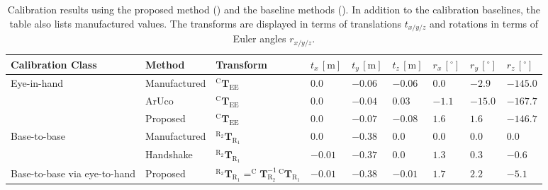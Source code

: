 \begin{landscape}
\begin{table}[]
\caption{Calibration results using the proposed method () and the baseline methods (). In addition to the calibration baselines, the table also lists manufactured values. The transforms are displayed in terms of translations $t_{x/y/z}$ and rotations in terms of Euler angles $r_{x/y/z}$.}
\label{c4:tab:calibration_results}
\centering
\begin{tabular}{|l|l|l|l|l|l|l|l|l|}
\hline
Calibration Class             & Method       & Transform                                                                                                        & $t_x\,[\text{m}]$ & $t_y\,[\text{m}]$ & $t_z\,[\text{m}]$ & $r_x\,[^\circ]$ & $r_y\,[^\circ]$ & $r_z\,[^\circ]$ \\ \hline
\multirow{3}{*}{Eye-in-hand}  & Manufactured & $^\text{C}\mathbf{T}_\text{EE}$                                                                                  & $ 0.0$            & $-0.06$           & $-0.06$           & $ 0.0$          & $-2.9$          & $-145.0$        \\ \cline{2-9} 
                              & ArUco        & $^\text{C}\mathbf{T}_\text{EE}$                                                                                  & $ 0.0$            & $-0.04$           & $ 0.03$           & $-1.1$          & $-15.0$         & $-167.7$        \\ \cline{2-9} 
                              & Proposed     & $^\text{C}\mathbf{T}_\text{EE}$                                                                                  & $ 0.0$            & $-0.07$           & $-0.08$           & $ 1.6$          & $ 1.6$          & $-146.7$        \\ \hline
\multirow{2}{*}{Base-to-base} & Manufactured & $^{\text{R}_2}\mathbf{T}_{\text{R}_1}$                                                                           & $ 0.0$            & $-0.38$           & $ 0.0$            & $0.0$           & $0.0$           & $ 0.0$          \\ \cline{2-9}
                              & Handshake    & $^{\text{R}_2}\mathbf{T}_{\text{R}_1}$                                                                           & $-0.01$           & $-0.37$           & $ 0.0$            & $1.3$           & $0.3$           & $-0.6$          \\ \hline
Base-to-base via eye-to-hand  & Proposed     & $^{\text{R}_2}\mathbf{T}_{\text{R}_1} = ^\text{C}\mathbf{T}^{-1}_{\text{R}_2}\,^\text{C}\mathbf{T}_{\text{R}_1}$ & $-0.01$           & $-0.38$           & $-0.01$           & $1.7$           & $2.2$           & $-5.1$          \\ \hline
\end{tabular}
\end{table}
\end{landscape}

